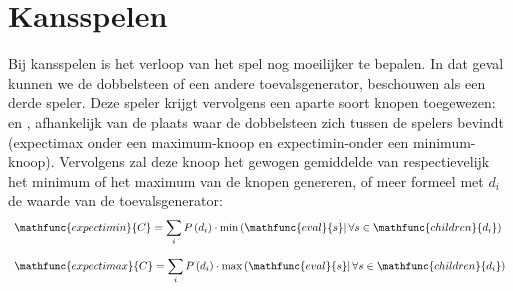 \section{Kansspelen}
Bij kansspelen is het verloop van het spel nog moeilijker te bepalen. In dat geval kunnen we de dobbelsteen of een andere toevalsgenerator, beschouwen als een derde speler. Deze speler krijgt vervolgens een aparte soort knopen toegewezen:  en , afhankelijk van de plaats waar de dobbelsteen zich tussen de spelers bevindt (expectimax onder een maximum-knoop en expectimin-onder een minimum-knoop). Vervolgens zal deze knoop het gewogen gemiddelde van respectievelijk het minimum of het maximum van de knopen genereren, of meer formeel met $d_i$ de waarde van de toevalsgenerator:
\begin{equation}
\begin{array}{l}
\mathfunc{expectimin}{C}=\displaystyle\sum_{i}{P\left(d_i\right)\cdot\mbox{min}\left(\mathfunc{eval}{s}\right|\forall s\in\mathfunc{children}{d_i})}\\\\
\mathfunc{expectimax}{C}=\displaystyle\sum_{i}{P\left(d_i\right)\cdot\mbox{max}\left(\mathfunc{eval}{s}\right|\forall s\in\mathfunc{children}{d_i})}
\end{array}
\end{equation}